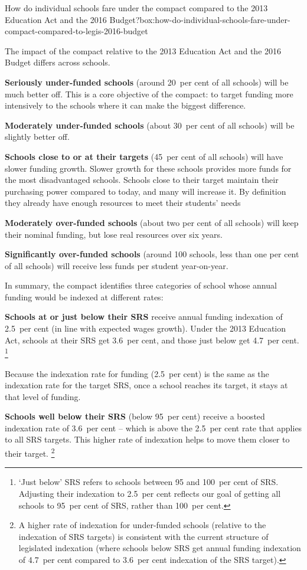 \documentclass{grattan}
\begin{document}
\begin{smallbox}{How do individual schools fare under the compact compared to the 2013 Education Act and the 2016 Budget?}{box:how-do-individual-schools-fare-under-compact-compared-to-legis-2016-budget}

The impact of the compact relative to the 2013 Education Act and the 2016 Budget differs across schools.

\textbf{Seriously under-funded schools} (around 20~per cent of all schools) will be much better off.
This is a core objective of the compact: to target funding more intensively to the schools where it can make the biggest difference.

\textbf{Moderately under-funded schools} (about 30~per cent of all schools) will be slightly better off.

\textbf{Schools close to or at their targets} (45~per cent of all schools) will have slower funding growth.
Slower growth for these schools provides more funds for the most disadvantaged schools.
Schools close to their target maintain their purchasing power compared to today, and many will increase it.
By definition they already have enough resources to meet their students' needs

\textbf{Moderately over-funded schools} (about two per cent of all schools) will keep their nominal funding, but lose real resources over six years.

\textbf{Significantly over-funded schools} (around 100 schools, less than one per cent of all schools) will receive less funds per student year-on-year.
\end{smallbox}

In summary, the compact identifies three categories of school whose annual funding would be indexed at different rates:

\textbf{Schools at or just below their SRS} receive annual funding indexation of 2.5~per cent (in line with expected wages growth).
Under the 2013 Education Act, schools at their SRS get 3.6~per cent, and those just below get 4.7~per cent.%
\footnote{`Just below' SRS refers to schools between 95 and 100~per cent of SRS\@.
Adjusting their indexation to 2.5~per cent reflects our goal of getting all schools to 95~per cent of SRS, rather than 100~per cent.}

Because the indexation rate for funding (2.5~per cent) is the same as the indexation rate for the target SRS, once a school reaches its target, it stays at that level of funding.

\textbf{Schools well below their SRS} (below 95~per cent) receive a boosted indexation rate of 3.6~per cent -- which is above the 2.5~per cent rate that applies to all SRS targets.
This higher rate of indexation helps to move them closer to their target.%
\footnote{A higher rate of indexation for under-funded schools (relative to the indexation of SRS targets) is consistent with the current structure of legislated indexation (where schools below SRS get annual funding indexation of 4.7~per cent compared to 3.6~per cent indexation of the SRS target).}
\end{document}
